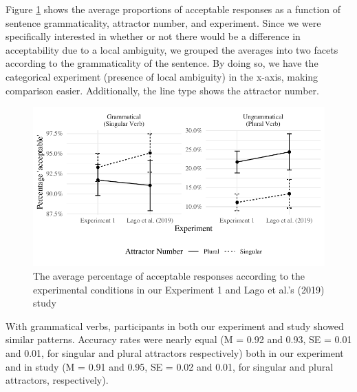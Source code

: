 Figure \ref{fig:exp1AvgResponse} shows the average proportions of acceptable responses as a function of sentence grammaticality, attractor number, and experiment. Since we were specifically interested in whether or not there would be a difference in acceptability due to a local ambiguity, we grouped the averages into two facets according to the grammaticality of the sentence. By doing so, we have the categorical experiment (presence of local ambiguity) in the x-axis, making comparison easier. Additionally, the line type shows the attractor number.  

\begin{knitrout}
\color{fgcolor}\begin{figure}[hbt!]

{\centering \includegraphics[width=\linewidth]{figure/exp1AvgResponse-1} 

}

\caption[The average percentage of acceptable responses according to the experimental conditions in our Experiment 1 and Lago et al.'s (2019) study]{The average percentage of acceptable responses according to the experimental conditions in our Experiment 1 and Lago et al.'s (2019) study}\label{fig:exp1AvgResponse}
\end{figure}

\end{knitrout}

With grammatical verbs, participants in both our experiment and \cites{LagoEtAl2019} study showed similar patterns. Accuracy rates were nearly equal (M = 0.92 and 0.93, SE = 0.01 and 0.01, for singular and plural attractors respectively) both in our experiment and in \cites{LagoEtAl2019} study (M = 0.91 and 0.95, SE = 0.02 and 0.01, for singular and plural attractors, respectively).

